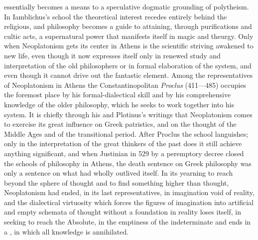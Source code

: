 essentially becomes a means to a speculative dogmatic grounding of
polytheism. In Iamblichus's school the theoretical interest recedes
entirely behind the religious, and philosophy becomes a guide to
attaining, through purifications and cultic acts, a supernatural power
that manifests itself in magic and theurgy. Only when Neoplatonism gets
its center in Athens is the scientific striving awakened to new life,
even though it now expresses itself only in renewed study and
interpretation of the old philosophers or in formal elaboration of the
system, and even though it cannot drive out the fantastic element.
Among the representatives of Neoplatonism in Athens the
Constantinopolitan \emph{Proclus} (411---485) occupies the foremost
place by his formal-dialectical skill and by his comprehensive knowledge
of the older philosophy, which he seeks to work together into his
system. It is chiefly through his and Plotinus's writings that
Neoplatonism comes to exercise its great influence on Greek patristics,
and on the thought of the Middle Ages and of the transitional period.
After Proclus the school languishes; only in the interpretation of the
great thinkers of the past does it still achieve anything significant,
and when Justinian in 529 by a peremptory decree closed the schools of
philosophy in Athens, the death sentence on Greek philosophy was only a
sentence on what had wholly outlived itself. In its yearning to reach
beyond the sphere of thought and to find something higher than thought,
Neoplatonism had ended, in its last representatives, in imagination
void of reality, and the dialectical virtuosity which forces the
figures of imagination into artificial and empty schemata of thought
without a foundation in reality loses itself, in seeking to reach the
Absolute, in the emptiness of the indeterminate and ends in a
, in which all knowledge is annihilated.

\divrule

